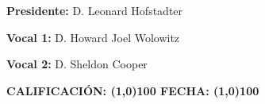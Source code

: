 \vspace{2.0cm}
\textbf{\Large Presidente:}{\Large{} D. Leonard Hofstadter}{\Large \par} %

\vspace{2.0cm}
\textbf{\Large Vocal 1:}{\Large{} D. Howard Joel Wolowitz}{\Large \par} %

\vspace{2.0cm}
\textbf{\Large Vocal 2:}{\Large{} D. Sheldon Cooper}{\Large \par} %

\vspace{0.8cm}
\textbf{ CALIFICACIÓN: \line(1,0){100} \hspace{1cm}FECHA: \line(1,0){100}  }{ \par}



